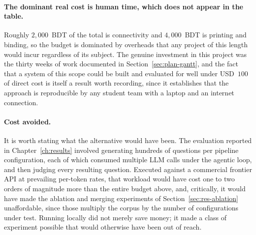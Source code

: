 \paragraph{The dominant real cost is human time, which does not appear in the table.}
Roughly $2{,}000$~BDT of the total is connectivity and $4{,}000$~BDT is printing and
binding, so the budget is dominated by overheads that any project of this length
would incur regardless of its subject. The genuine investment in this project was the thirty weeks of work documented
in Section~\ref{sec:plan-gantt}, and the fact that a system of this scope could be
built and evaluated for well under USD~$100$ of direct cost is itself a result worth
recording, since it establishes that the approach is reproducible by any student team
with a laptop and an internet connection.

\paragraph{Cost avoided.} It is worth stating what the alternative would have been.
The evaluation reported in Chapter~\ref{ch:results} involved generating hundreds of
questions per pipeline configuration, each of which consumed multiple LLM calls under
the agentic loop, and then judging every resulting question. Executed against a
commercial frontier API at prevailing per-token rates, that workload would have cost
one to two orders of magnitude more than the entire budget above, and, critically,
it would have made the ablation and merging experiments of
Section~\ref{sec:res-ablation} unaffordable, since those multiply the corpus by the
number of configurations under test. Running locally did not merely save money; it
made a class of experiment possible that would otherwise have been out of reach.
